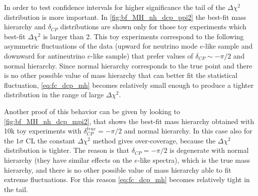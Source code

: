 In order to test confidence intervals for higher significance the tail of the $\Delta \chi^2$ distribution is more important. 
In \cref{fig:bf_MH_nh_dcp_ppi2} the best-fit mass hierarchy and $\delta_{CP}$ distributions
are shown only for those toy experiments which best-fit $\Delta \chi^2$ is larger than 2.
This toy experiments correspond to the following asymmetric fluctuations of the data 
(upward for neutrino mode $e$-like sample
and downward for antineutrino $e$-like sample)
that prefer values of $\delta_{CP} \sim -\pi/2$ and normal hierarchy.
Since normal hierarchy corresponds to the true point 
and there is no other possible value of mass hierarchy that can better fit the statistical fluctuation,
\cref{eq:fc_dcp_mh} becomes relatively small enough to produce a tighter distribution
in the range of large $\Delta \chi^2$. 
\newline

Another proof of this behavior can be given by looking to \cref{fig:bf_MH_nh_dcp_mpi2},
that shows the best-fit mass hierarchy obtained with 10k toy experiments
with $\delta_{CP}^{true} = -\pi/2$ and normal hierarchy.
In this case also for the $1\sigma$ CL the constant $\Delta \chi^2$ method gives over-coverage,
because the $\Delta \chi^2$ distribution is tighter.
The reason is that $\delta_{CP} = -\pi/2$ is degenerate with normal hierarchy 
(they have similar effects on the $e$-like spectra), which is the true mass hierarchy,
and there is no other possible value of mass hierarchy able to fit extreme fluctuations.
For this reason \cref{eq:fc_dcp_mh} becomes relatively tight in the tail.
\newline

